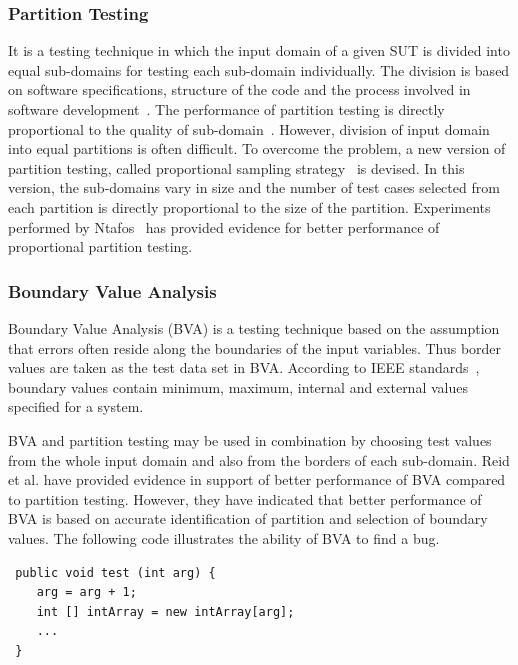 \subsubsection{Partition Testing}
It is a testing technique in which the input domain of a given SUT is divided into equal sub-domains for testing each sub-domain individually. The division is based on software specifications, structure of the code and the process involved in software development~\cite{hamlet1990partition}. The performance of partition testing is directly proportional to the quality of sub-domain~\cite{weyuker1991analyzing}. However, division of input domain into equal partitions is often difficult. To overcome the problem, a new version of partition testing, called proportional sampling strategy~\cite{chan1996proportional} is devised. In this version, the sub-domains vary in size and the number of test cases selected from each partition is directly proportional to the size of the partition. Experiments performed by Ntafos~\cite{ntafos1998random} has provided evidence for better performance of proportional partition testing.


\subsubsection{Boundary Value Analysis}
Boundary Value Analysis (BVA) is a testing technique based on the assumption that errors often reside along the boundaries of the input variables. Thus border values are taken as the test data set in BVA. According to IEEE standards~\cite{radatz1990ieee}, boundary values contain minimum, maximum, internal and external values specified for a system. 

BVA and partition testing may be used in combination by choosing test values from the whole input domain and also from the borders of each sub-domain. Reid et al. \cite{reid1997empirical} have provided evidence in support of better performance of BVA compared to partition testing. However, they have indicated that better performance of BVA is based on accurate identification of partition and selection of boundary values. The following code illustrates the ability of BVA to find a bug. 

\begin{lstlisting}
 public void test (int arg) {
	arg = arg + 1;
	int [] intArray = new intArray[arg];
	...
 }
\end{lstlisting}


